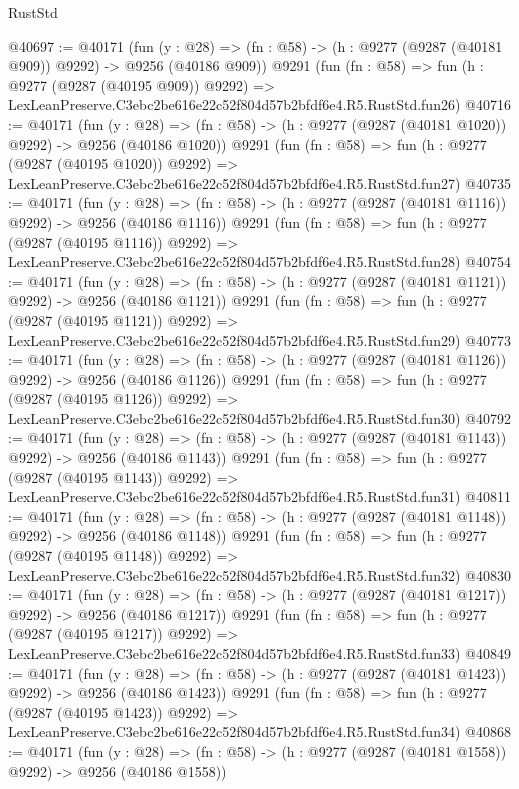 \begin{lexlean}{RustStd}
\begin{coremodule}
@40697 := @40171
    (fun (y : @28) => (fn : @58) -> (h : @9277 (@9287 (@40181 @909)) @9292) -> @9256 (@40186 @909))
    @9291
    (fun (fn : @58) =>
    fun (h : @9277 (@9287 (@40195 @909)) @9292) =>
    LexLeanPreserve.C3ebc2be616e22c52f804d57b2bfdf6e4.R5.RustStd.fun26)
@40716 := @40171
    (fun (y : @28) =>
    (fn : @58) -> (h : @9277 (@9287 (@40181 @1020)) @9292) -> @9256 (@40186 @1020))
    @9291
    (fun (fn : @58) =>
    fun (h : @9277 (@9287 (@40195 @1020)) @9292) =>
    LexLeanPreserve.C3ebc2be616e22c52f804d57b2bfdf6e4.R5.RustStd.fun27)
@40735 := @40171
    (fun (y : @28) =>
    (fn : @58) -> (h : @9277 (@9287 (@40181 @1116)) @9292) -> @9256 (@40186 @1116))
    @9291
    (fun (fn : @58) =>
    fun (h : @9277 (@9287 (@40195 @1116)) @9292) =>
    LexLeanPreserve.C3ebc2be616e22c52f804d57b2bfdf6e4.R5.RustStd.fun28)
@40754 := @40171
    (fun (y : @28) =>
    (fn : @58) -> (h : @9277 (@9287 (@40181 @1121)) @9292) -> @9256 (@40186 @1121))
    @9291
    (fun (fn : @58) =>
    fun (h : @9277 (@9287 (@40195 @1121)) @9292) =>
    LexLeanPreserve.C3ebc2be616e22c52f804d57b2bfdf6e4.R5.RustStd.fun29)
@40773 := @40171
    (fun (y : @28) =>
    (fn : @58) -> (h : @9277 (@9287 (@40181 @1126)) @9292) -> @9256 (@40186 @1126))
    @9291
    (fun (fn : @58) =>
    fun (h : @9277 (@9287 (@40195 @1126)) @9292) =>
    LexLeanPreserve.C3ebc2be616e22c52f804d57b2bfdf6e4.R5.RustStd.fun30)
@40792 := @40171
    (fun (y : @28) =>
    (fn : @58) -> (h : @9277 (@9287 (@40181 @1143)) @9292) -> @9256 (@40186 @1143))
    @9291
    (fun (fn : @58) =>
    fun (h : @9277 (@9287 (@40195 @1143)) @9292) =>
    LexLeanPreserve.C3ebc2be616e22c52f804d57b2bfdf6e4.R5.RustStd.fun31)
@40811 := @40171
    (fun (y : @28) =>
    (fn : @58) -> (h : @9277 (@9287 (@40181 @1148)) @9292) -> @9256 (@40186 @1148))
    @9291
    (fun (fn : @58) =>
    fun (h : @9277 (@9287 (@40195 @1148)) @9292) =>
    LexLeanPreserve.C3ebc2be616e22c52f804d57b2bfdf6e4.R5.RustStd.fun32)
@40830 := @40171
    (fun (y : @28) =>
    (fn : @58) -> (h : @9277 (@9287 (@40181 @1217)) @9292) -> @9256 (@40186 @1217))
    @9291
    (fun (fn : @58) =>
    fun (h : @9277 (@9287 (@40195 @1217)) @9292) =>
    LexLeanPreserve.C3ebc2be616e22c52f804d57b2bfdf6e4.R5.RustStd.fun33)
@40849 := @40171
    (fun (y : @28) =>
    (fn : @58) -> (h : @9277 (@9287 (@40181 @1423)) @9292) -> @9256 (@40186 @1423))
    @9291
    (fun (fn : @58) =>
    fun (h : @9277 (@9287 (@40195 @1423)) @9292) =>
    LexLeanPreserve.C3ebc2be616e22c52f804d57b2bfdf6e4.R5.RustStd.fun34)
@40868 := @40171
    (fun (y : @28) =>
    (fn : @58) -> (h : @9277 (@9287 (@40181 @1558)) @9292) -> @9256 (@40186 @1558))

\end{coremodule}
\end{lexlean}
